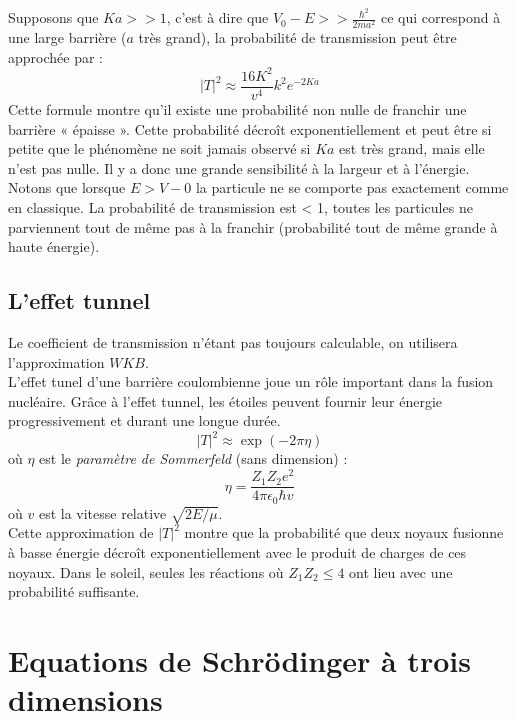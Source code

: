 \documentclass	[11pt, a4paper, openany]{book}
\begin{document}
	Supposons que $Ka >> 1$, c'est à dire que $V_0 - E >> \frac{\hbar^2}{2ma^2}$ ce qui correspond à une large barrière ($a$ très grand), la probabilité de transmission peut être approchée par :
	\begin{equation}
		|T|^2 \approx \frac{16K^2}{v^4}k^2e^{-2Ka}
	\end{equation}
	Cette formule montre qu'il existe une probabilité non nulle de franchir une barrière
	« épaisse ». Cette probabilité décroît exponentiellement et peut être si petite que le
	phénomène ne soit jamais observé si $Ka$ est très grand, mais elle n'est pas nulle. Il y a donc une grande sensibilité à la largeur et à l'énergie.\\
	
	Notons que lorsque $E > V-0$ la particule ne se comporte pas exactement comme en classique. La probabilité de transmission est < 1, toutes les particules ne parviennent tout de même pas à la franchir (probabilité tout de même grande à  haute énergie).
	
	
	\section{L'effet tunnel}
	Le coefficient de transmission n'étant pas toujours calculable, on utilisera l'approximation $WKB$.\\
	
	L'effet tunel d'une barrière coulombienne joue un rôle important dans la fusion nucléaire. Grâce à l'effet tunnel, les étoiles peuvent fournir leur énergie progressivement et durant une longue durée.
	\begin{equation}
		|T|^2 \approx \exp(-2\pi\eta)
	\end{equation}
	où $\eta$ est le \textit{paramètre de Sommerfeld} (sans dimension) :
	\begin{equation}
		\eta = \frac{Z_1Z_2e^2}{4\pi\epsilon_0\hbar v}
	\end{equation}
	où $v$ est la vitesse relative $\sqrt{2E/\mu}$.\\
	
	Cette approximation de $|T|^2$ montre que la probabilité que deux noyaux fusionne à basse énergie décroît exponentiellement avec le produit de charges de ces noyaux. 
	Dans le soleil, seules les réactions où $Z_1Z_2 \leq 4$ ont lieu avec une probabilité suffisante.\\
	\chapter{Equations de Schrödinger à trois dimensions}
\end{document}
